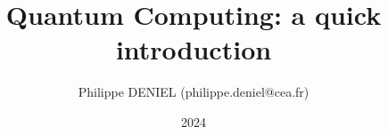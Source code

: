 \documentclass[aspectratio=1610,10pt,dvipsnames]{beamer}
\title{Quantum Computing: a quick introduction}
\date{2024}
\institute{CEA}
\author{Philippe DENIEL (philippe.deniel@cea.fr)}
\begin{document}
\frame{\titlepage}









\end{document}
